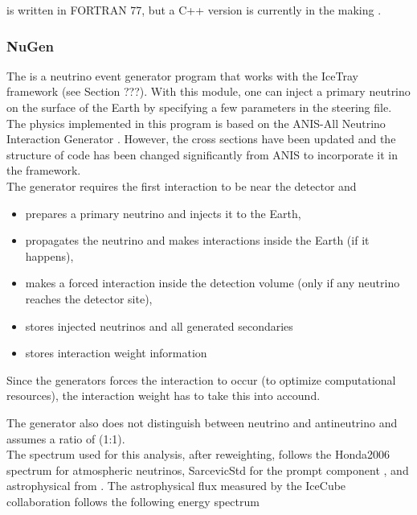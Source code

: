 \noindent {} is written in FORTRAN 77, but a C++ version is currently in the making \cite{Engel:2018akg}.
\subsubsection{NuGen}
The  is a neutrino event generator program that works with the IceTray framework (see Section ???). With this module, one can inject a primary neutrino on the surface of the Earth by specifying a few parameters in the steering file.\\

\noindent The physics implemented in this program is based on the ANIS-All Neutrino Interaction Generator \cite{Gazizov:2004va}. However, the cross sections have been updated and the structure of code has been changed significantly from ANIS to incorporate it in the  framework.\\

\noindent The generator requires the first interaction to be near the detector and

\begin{itemize}
\item prepares a primary neutrino and injects it to the Earth,
\item propagates the neutrino and makes interactions inside the Earth (if it happens),
\item makes a forced interaction inside the detection volume (only if any neutrino reaches the detector site),
\item stores injected neutrinos and all generated secondaries
\item stores interaction weight information
\end{itemize}
\vspace{3mm}
\noindent Since the generators forces the interaction to occur (to optimize computational resources), the interaction weight has to take this into accound.

The generator also does not distinguish between neutrino and antineutrino and assumes  a ratio of (1:1).\\

\noindent The spectrum used for this analysis, after reweighting, follows the Honda2006 spectrum \cite{Honda:2006qj} for atmospheric neutrinos, SarcevicStd for the prompt component \cite{Enberg:2008te}, and astrophysical from \cite{Aartsen:2014gkd}. The astrophysical flux measured by the IceCube collaboration follows the following energy spectrum

